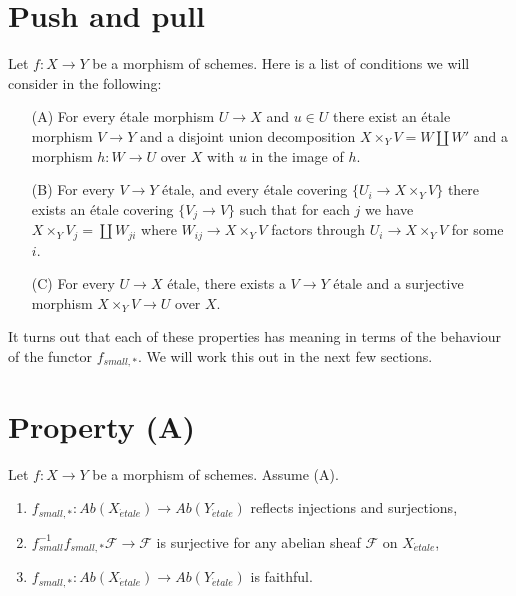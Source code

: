 \section{Push and pull}
\label{section-monomorphisms}

\noindent
Let $f : X \to Y$ be a morphism of schemes.
Here is a list of conditions we will consider in the following:
\begin{enumerate}
\item[(A)] For every \'etale morphism $U \to X$ and $u \in U$ there exist
an \'etale morphism $V \to Y$ and a disjoint union decomposition
$X \times_Y V = W \amalg W'$ and a morphism $h : W \to U$ over $X$
with $u$ in the image of $h$.
\item[(B)] For every $V \to Y$ \'etale, and every \'etale covering
$\{U_i \to X \times_Y V\}$ there exists an \'etale covering
$\{V_j \to V\}$ such that for each $j$ we have
$X \times_Y V_j = \coprod W_{ji}$ where $W_{ij} \to X \times_Y V$
factors through $U_i \to X \times_Y V$ for some $i$.
\item[(C)] For every $U \to X$ \'etale, there exists a $V \to Y$ \'etale
and a surjective morphism $X \times_Y V \to U$ over $X$.
\end{enumerate}
It turns out that each of these properties has meaning in terms of
the behaviour of the functor $f_{small, *}$. We will work this
out in the next few sections.



\section{Property (A)}
\label{section-A}

\begin{lemma}
\label{lemma-property-A-implies}
Let $f : X \to Y$ be a morphism of schemes.
Assume (A).
\begin{enumerate}
\item
$f_{small, *} :
\textit{Ab}(X_{\acute{e}tale})
\to
\textit{Ab}(Y_{\acute{e}tale})$
reflects injections and surjections,
\item $f_{small}^{-1}f_{small, *}\mathcal{F} \to \mathcal{F}$
is surjective for any abelian sheaf $\mathcal{F}$ on $X_{\acute{e}tale}$,
\item
$f_{small, *} :
\textit{Ab}(X_{\acute{e}tale})
\to
\textit{Ab}(Y_{\acute{e}tale})$
is faithful.
\end{enumerate}
\end{lemma}

